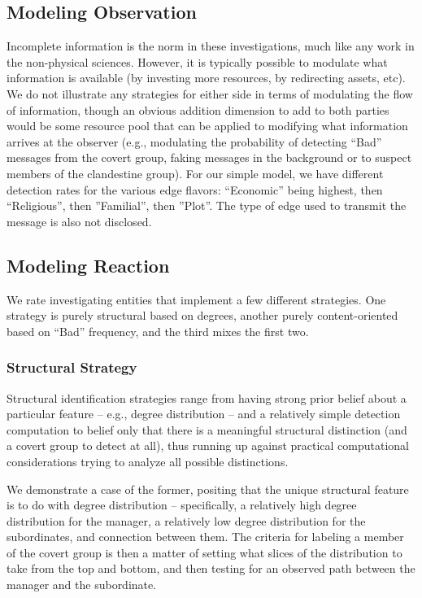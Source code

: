 \documentclass{article}
\begin{document}
\subsection*{Modeling Observation}
Incomplete information is the norm in these investigations, much like any work in the non-physical sciences.  However, it is typically possible to modulate what information is available (by investing more resources, by redirecting assets, etc).  We do not illustrate any strategies for either side in terms of modulating the flow of information, though an obvious addition dimension to add to both parties would be some resource pool that can be applied to modifying what information arrives at the observer (e.g., modulating the probability of detecting ``Bad'' messages from the covert group, faking messages in the background or to suspect members of the clandestine group).  For our simple model, we have different detection rates for the various edge flavors: ``Economic'' being highest, then ``Religious'', then ''Familial'', then ''Plot''.  The type of edge used to transmit the message is also not disclosed.

\subsection*{Modeling Reaction}
We rate investigating entities that implement a few different strategies.  One strategy is purely structural based on degrees, another purely content-oriented based on ``Bad'' frequency, and the third mixes the first two.

\subsubsection*{Structural Strategy}
Structural identification strategies range from having strong prior belief about a particular feature -- e.g., degree distribution -- and a relatively simple detection computation to belief only that there is a meaningful structural distinction (and a covert group to detect at all), thus running up against practical computational considerations trying to analyze all possible distinctions.

We demonstrate a case of the former, positing that the unique structural feature is to do with degree distribution -- specifically, a relatively high degree distribution for the manager, a relatively low degree distribution for the subordinates, and connection between them.  The criteria for labeling a member of the covert group is then a matter of setting what slices of the distribution to take from the top and bottom, and then testing for an observed path between the manager and the subordinate.
\end{document}
